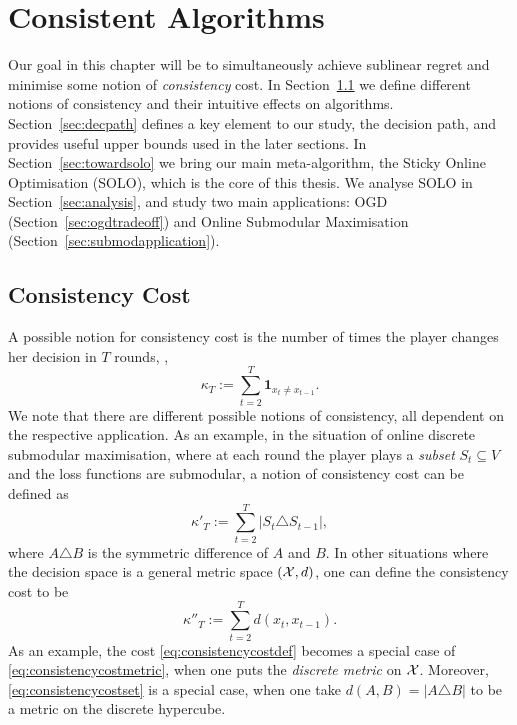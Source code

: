 \chapter{Consistent Algorithms}
Our goal in this chapter will be to simultaneously achieve sublinear regret and minimise some notion of {\em consistency} cost. In Section~\ref{sec:cost} we define different notions of consistency and their intuitive effects on algorithms. Section~\ref{sec:decpath} defines a key element to our study, the decision path, and provides useful upper bounds used in the later sections. In Section~\ref{sec:towardsolo} we bring our main meta-algorithm, the Sticky Online Optimisation (SOLO), which is the core of this thesis. We analyse SOLO in Section~\ref{sec:analysis}, and study two main applications: OGD (Section~\ref{sec:ogdtradeoff}) and Online Submodular Maximisation (Section~\ref{sec:submodapplication}).

\section{Consistency Cost}\label{sec:cost}
A possible notion for consistency cost is the number of times the player changes her decision in $T$ rounds, \ie,
\begin{equation}\label{eq:consistencycostdef}
    \kappa_T := \sum_{t = 2}^T \mathbf{1}_{x_{t} \not= x_{t - 1}}.
\end{equation}
We note that there are different possible notions of consistency, all dependent on the respective application. As an example, in the situation of online discrete submodular maximisation, where at each round the player plays a \emph{subset} $S_t \subseteq V$ and the loss functions are submodular, a notion of consistency cost can be defined as 
\begin{equation}\label{eq:consistencycostset}
    \kappa'_T := \sum_{t=2}^T |S_t \triangle S_{t-1}|,
\end{equation}
where $A\triangle B$ is the symmetric difference of $A$ and $B$. In other situations where the decision space is a general metric space $(\mathcal{X}, d)$, one can define the consistency cost to be
\begin{equation}\label{eq:consistencycostmetric}
    \kappa''_T := \sum_{t=2}^T d(x_t, x_{t-1}).
\end{equation}
As an example, the cost \eqref{eq:consistencycostdef} becomes a special case of \eqref{eq:consistencycostmetric}, when one puts the \emph{discrete metric} on $\mathcal{X}$. Moreover, \eqref{eq:consistencycostset} is a special case, when one take $d(A, B) = |A\triangle B|$ to be a metric on the discrete hypercube.

